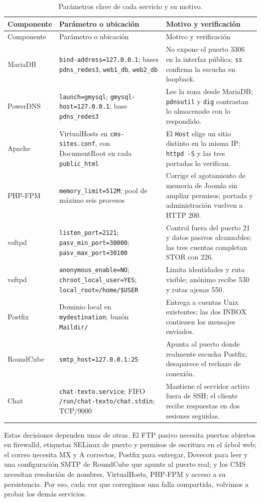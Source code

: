 \documentclass[11pt,a4paper]{article}
\newcommand{\ruta}[1]{\nolinkurl{#1}}
\begin{document}
\begin{longtable}{@{}p{2.3cm}p{5.2cm}p{5.3cm}@{}}
\caption{Parámetros clave de cada servicio y su motivo.}\label{tab:parametros}\\
\toprule Componente & Parámetro o ubicación & Motivo y verificación \\\midrule\endfirsthead
\toprule Componente & Parámetro o ubicación & Motivo y verificación \\\midrule\endhead
MariaDB & \texttt{bind-address=127.0.0.1}; bases \texttt{pdns\_redes3}, \texttt{web1\_db}, \texttt{web2\_db} & No expone el puerto 3306 en la interfaz pública; \texttt{ss} confirma la escucha en loopback. \\
PowerDNS & \texttt{launch=gmysql}; \texttt{gmysql-host=127.0.0.1}; base \texttt{pdns\_redes3} & Lee la zona desde MariaDB; \texttt{pdnsutil} y \texttt{dig} contrastan lo almacenado con lo respondido. \\
Apache & VirtualHosts en \texttt{cms-sites.conf}, con DocumentRoot en cada \texttt{public\_html} & El \texttt{Host} elige un sitio distinto en la misma IP; \texttt{httpd -S} y las tres portadas lo verifican. \\
PHP-FPM & \texttt{memory\_limit=512M}; pool de máximo seis procesos & Corrige el agotamiento de memoria de Joomla sin ampliar permisos; portada y administración vuelven a HTTP 200. \\
vsftpd & \texttt{listen\_port=2121}; \texttt{pasv\_min\_port=30000}; \texttt{pasv\_max\_port=30100} & Control fuera del puerto 21 y datos pasivos alcanzables; las tres cuentas completan STOR con 226. \\
vsftpd & \texttt{anonymous\_enable=NO}; \texttt{chroot\_local\_user=YES}; \texttt{local\_root=/home/\$USER} & Limita identidades y ruta visible; anónimo recibe 530 y rutas ajenas 550. \\
Postfix & Dominio local en \texttt{mydestination}; buzón \texttt{Maildir/} & Entrega a cuentas Unix existentes; las dos INBOX contienen los mensajes enviados. \\
RoundCube & \texttt{smtp\_host=127.0.0.1:25} & Apunta al puerto donde realmente escucha Postfix; desaparece el rechazo de conexión. \\
Chat & \texttt{chat-texto.service}; FIFO \ruta{/run/chat-texto/chat.stdin}; TCP/9000 & Mantiene el servidor activo fuera de SSH; el cliente recibe respuestas en dos sesiones seguidas. \\
\bottomrule
\end{longtable}

Estas decisiones dependen unas de otras. El FTP pasivo necesita puertos abiertos en firewalld, etiquetas SELinux de puerto y permisos de escritura en el árbol web; el correo necesita MX y A correctos, Postfix para entregar, Dovecot para leer y una configuración SMTP de RoundCube que apunte al puerto real; y los CMS necesitan resolución de nombres, VirtualHosts, PHP-FPM y acceso a su persistencia. Por eso, cada vez que corregimos una falla compartida, volvimos a probar los demás servicios.
\end{document}
